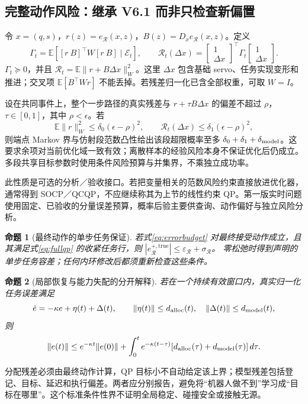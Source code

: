 \documentclass[UTF8,11pt,a4paper,fontset=fandol]{ctexart}
\numberwithin{equation}{section}
\newtheorem{proposition}{命题}[section]
\theoremstyle{definition}
\newcommand{\E}{\mathbb E}
\begin{document}
\subsection{完整动作风险：继承 V6.1 而非只检查新偏置}
令 $x=(q,s)$，$r(z)=e_{\mathcal R}(x,z)$，$B(z)=D_xe_{\mathcal R}(x,z)$。定义
\begin{equation}
\Gamma_t=\E\!\left[[r\ B]^\top W[r\ B]\mid\mathcal E_t\right],\qquad
\mathscr R_t(\Delta x)=
\begin{bmatrix}1\\\Delta x\end{bmatrix}^{\!\top}
\Gamma_t
\begin{bmatrix}1\\\Delta x\end{bmatrix}.
\label{eq:fullrisk82}
\end{equation}
$\Gamma_t\succeq0$，并且 $\mathscr R_t=\E\|r+B\Delta x\|_W^2$。这里 $\Delta x$ 包含基础 servo、任务实现变形和推进；交叉项 $\E[B^\top Wr]$ 不能丢掉。若残差归一化已含全部权重，可取 $W=I$。

设在共同事件上，整个一步路径的真实残差与 $r+\tau B\Delta x$ 的偏差不超过 $\rho$，$\tau\in[0,1]$，其中 $\rho<\epsilon$。若
\begin{equation}
\E\|r\|_W^2\le\delta_0(\epsilon-\rho)^2,
\qquad
\mathscr R_t(\Delta x)\le\delta_1(\epsilon-\rho)^2,
\label{eq:segmentrisk82}
\end{equation}
则端点 Markov 界与仿射段范数凸性给出该段超限概率至多 $\delta_0+\delta_1+\delta_{\rm model}$。这要求余项对当前优化域一致有效；离散样本的经验风险本身不保证优化后仍成立。多段共享目标参数时使用条件风险预算与并集界，不乘独立成功率。

此性质是可选的分析／验收接口。若把变量相关的范数风险约束直接放进优化器，通常得到 SOCP／QCQP，不应继续称其为上节的线性约束 QP。第一版实时问题使用固定、已验收的分量误差预算，概率后验主要供查询、动作偏好与独立风险分析。

\begin{proposition}[最终动作的单步任务保证]
若式\eqref{eq:errorbudget} 对最终接受动作成立，且其满足式\eqref{eq:fullqp} 的收紧任务行，则
$|e_{\mathcal R}^{+,\mathrm{true}}|\le\varepsilon_{\mathcal R}+\sigma_{\mathcal R}$。
零松弛时得到声明的单步任务容差；任何内环修改后都须重新检查这些条件。
\label{prop:qp}
\end{proposition}

\begin{proposition}[局部恢复与能力失配的分开解释]
若在一个持续有效窗口内，真实归一化任务误差满足
\begin{equation}
\dot e=-\kappa e+\eta(t)+\Delta(t),\qquad
\|\eta(t)\|\le d_{\rm alloc}(t),\quad
\|\Delta(t)\|\le d_{\rm model}(t),
\label{eq:issmodel}
\end{equation}
则
\begin{equation}
\|e(t)\|\le e^{-\kappa t}\|e(0)\|+
\int_0^t e^{-\kappa(t-\tau)}
[d_{\rm alloc}(\tau)+d_{\rm model}(\tau)]\,d\tau.
\label{eq:issbound}
\end{equation}
\label{prop:iss}
\end{proposition}
分配残差必须由最终动作计算，QP 目标小不自动给定该上界；模型残差包括登记、目标、延迟和执行偏差。两者应分别报告，避免将“机器人做不到”学习成“目标在哪里”。这个标准条件性界不证明全局稳定、碰撞安全或接触无源。
\end{document}
